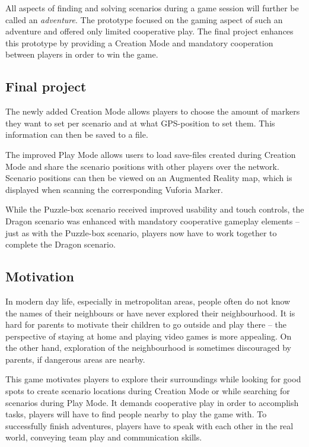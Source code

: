 \documentclass{sigchi-ext}
\begin{document}
All aspects of finding and solving scenarios during a game session will further be called an \textit{adventure}. The prototype focused on the gaming aspect of such an adventure and offered only limited cooperative play. The final project enhances this prototype by providing a Creation Mode and mandatory cooperation between players in order to win the game.

\subsection{Final project}

The newly added Creation Mode allows players to choose the amount of markers they want to set per scenario and at what GPS-position to set them. This information can then be saved to a file.

The improved Play Mode allows users to load save-files created during Creation Mode and share the scenario positions with other players over the network. Scenario positions can then be viewed on an Augmented Reality map, which is displayed when scanning the corresponding Vuforia Marker.

While the Puzzle-box scenario received improved usability and touch controls, the Dragon scenario was enhanced with mandatory cooperative gameplay elements -- just as with the Puzzle-box scenario, players now have to work together to complete the Dragon scenario.

\subsection{Motivation}

In modern day life, especially in metropolitan areas, people often do not know the names of their neighbours or have never explored their neighbourhood. It is hard for
parents to motivate their children to go outside and play there -- the perspective of staying at home and playing video games is more appealing. On the other hand, exploration of the neighbourhood is sometimes discouraged by parents, if dangerous areas are nearby.

This game motivates players to explore their surroundings while looking for good spots to create scenario locations during Creation Mode or while searching for scenarios during Play Mode. It demands cooperative play in order to accomplish tasks, players will have to find people nearby
to play the game with. To successfully finish adventures, players have to speak with each other in the real world, conveying team play and communication skills. 
\end{document}

